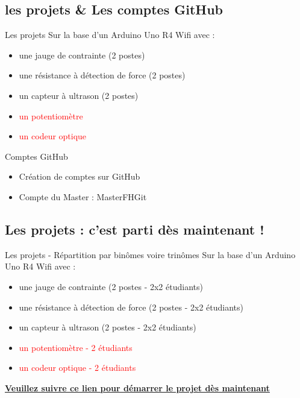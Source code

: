 \documentclass[a4paper,11pt]{beamer}
\begin{document}
\subsection{les projets \& Les comptes GitHub}
\begin{frame}	
	\begin{block}{Les projets}
	Sur la base d'un Arduino Uno R4 Wifi avec :
		\begin{itemize}
			\item une jauge de contrainte (2 postes)
			\item une résistance à détection de force (2 postes)
			\item un capteur à ultrason (2 postes)
			\item \textcolor{red}{un potentiomètre}
			\item \textcolor{red}{un codeur optique}
		\end{itemize}
	\end{block}
	\begin{block}{Comptes GitHub}
		\begin{itemize}
			\item Création de comptes sur GitHub
			\item Compte du Master : MasterFHGit
		\end{itemize}	
	\end{block}	
\end{frame}

\subsection{Les projets : c'est parti dès maintenant !}
\begin{frame}

\begin{block}{Les projets - Répartition par binômes voire trinômes}
Sur la base d'un Arduino Uno R4 Wifi avec :
	\begin{itemize}
		\item une jauge de contrainte (2 postes - 2x2 étudiants)
		\item une résistance à détection de force (2 postes - 2x2 étudiants)
		\item un capteur à ultrason (2 postes - 2x2 étudiants)
		\item \textcolor{red}{un potentiomètre - 2 étudiants}
		\item \textcolor{red}{un codeur optique - 2 étudiants}
	\end{itemize}
\end{block}
\centering

\normalsize
\textcolor{blue}{\textbf{\underline{\href{https://raw.githubusercontent.com/fbuloup/CodeManagementWithGit/main/projets.pdf}{Veuillez suivre ce lien pour démarrer le projet dès maintenant}}}}	
\end{frame}
\end{document}
